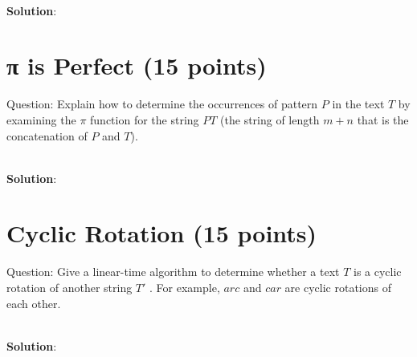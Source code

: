 \documentclass{article}
\begin{document}
~\\
\textbf{Solution}:\newline
\indent 

\section{π is Perfect (15 points)}
Question: Explain how to determine the occurrences of pattern $P$ in the text $T$ by examining the $\pi$ function for the string $PT$ (the string of length $m+n$ that is the concatenation of $P$ and $T$).

~\\
\textbf{Solution}:\newline
\indent

\section{Cyclic Rotation (15 points)}
Question: Give a linear-time algorithm to determine whether a text $T$ is a cyclic rotation of another string $T'$ . For example, $arc$ and $car$ are cyclic rotations of each other.

~\\
\textbf{Solution}:\newline
\indent
\end{document}
